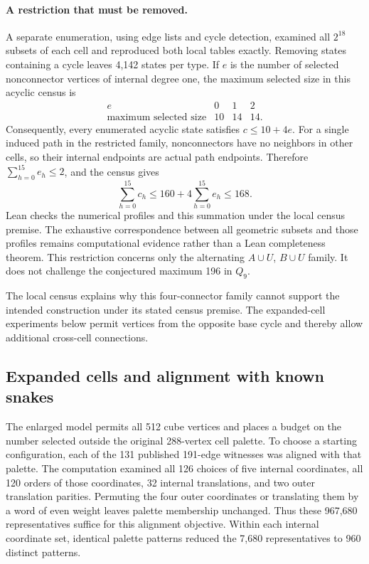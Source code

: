 \documentclass[11pt,a4paper]{article}
\theoremstyle{definition}
\theoremstyle{remark}
\begin{document}
\paragraph{A restriction that must be removed.}
A separate enumeration, using edge lists and cycle detection, examined all $2^{18}$ subsets of each cell and reproduced both local tables exactly. Removing states containing a cycle leaves 4,142 states per type. If $e$ is the number of selected nonconnector vertices of internal degree one, the maximum selected size in this acyclic census is
\[
\begin{array}{c|rrr}
e&0&1&2\\\hline
\text{maximum selected size}&10&14&14.
\end{array}
\]
Consequently, every enumerated acyclic state satisfies $c\le10+4e$. For a single induced path in the restricted family, nonconnectors have no neighbors in other cells, so their internal endpoints are actual path endpoints. Therefore $\sum_{h=0}^{15}e_h\le2$, and the census gives
\[
\sum_{h=0}^{15}c_h\le160+4\sum_{h=0}^{15}e_h\le168.
\]
Lean checks the numerical profiles and this summation under the local census premise. The exhaustive correspondence between all geometric subsets and those profiles remains computational evidence rather than a Lean completeness theorem. This restriction concerns only the alternating $A\cup U$, $B\cup U$ family. It does not challenge the conjectured maximum 196 in $Q_9$.

The local census explains why this four-connector family cannot support the intended construction under its stated census premise. The expanded-cell experiments below permit vertices from the opposite base cycle and thereby allow additional cross-cell connections.

\subsection{Expanded cells and alignment with known snakes}
The enlarged model permits all 512 cube vertices and places a budget on the number selected outside the original 288-vertex cell palette. To choose a starting configuration, each of the 131 published 191-edge witnesses was aligned with that palette. The computation examined all 126 choices of five internal coordinates, all 120 orders of those coordinates, 32 internal translations, and two outer translation parities. Permuting the four outer coordinates or translating them by a word of even weight leaves palette membership unchanged. Thus these 967,680 representatives suffice for this alignment objective. Within each internal coordinate set, identical palette patterns reduced the 7,680 representatives to 960 distinct patterns.
\end{document}
